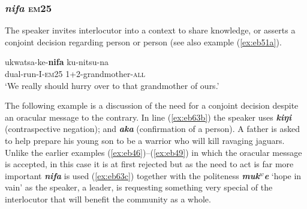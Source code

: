 \documentclass[output=paper]{langsci/langscibook}
\begin{document}
\subsubsection{\textit{nifa} \textsc{em}25} 
The speaker invites interlocutor into a context to share knowledge, or asserts a conjoint decision regarding  person or  person (see also example (\ref{ex:eb51a}).

\begin{exe}
	\ex \label{ex:eb62}
	\gll ukwatsa-ke-\textbf{nifa} ku-nitsu-na\\ 
	dual-run-I-\textsc{em25} 1+2-grandmother-\textsc{all}\\
	\trans ‘We really should hurry over to that grandmother of ours.’
\end{exe}

The following example is a discussion of the need for a conjoint decision despite an oracular message to the contrary. In line (\ref{ex:eb63b}) the speaker uses \textbf{\textit{kiŋi}} (contraspective negation); and \textbf{\textit{aka}} (confirmation of a  person).  A father is asked to help prepare his young son  to be a warrior who will kill ravaging jaguars.  Unlike the earlier examples (\ref{ex:eb46})--(\ref{ex:eb49}) in which the oracular message is accepted, in this case it is at first rejected but as the need to act is far more important  \textbf{\textit{nifa}} is used (\ref{ex:eb63c}) together with the politeness  \textbf{\textit{muk$^w$e}} ‘hope in vain’ as the speaker, a leader,  is requesting something very special of the interlocutor that will benefit the community as a whole.
\end{document}

